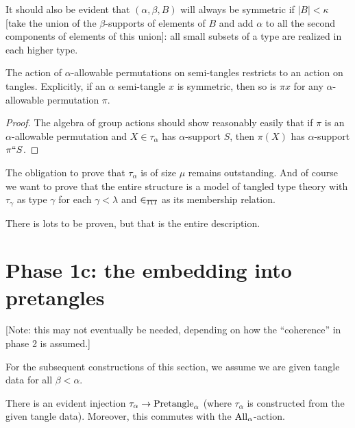 \begin{lemma}
\label {lem:small-subsets-closure}
\leanok
It should also be evident that $(\alpha,\beta,B)$ will always be symmetric if $|B|<\kappa$ [take the union of the $\beta$-supports of elements of $B$ and add $\alpha$ to all the second components of elements of this union]:  all small subsets of a type are realized in each higher type.
\end{lemma}

\begin{lemma}
  \label{lem:tangle-action}
  \leanok
  The action of $\alpha$-allowable permutations on semi-tangles restricts to an action on tangles.  Explicitly, if an $\alpha$ semi-tangle $x$ is symmetric, then so is $\pi x$ for any $\alpha$-allowable permutation $\pi$.
\end{lemma}
\begin{proof}
  The algebra of group actions should show reasonably easily that if $\pi$ is an $\alpha$-allowable permutation and $X \in \tau_\alpha$ has $\alpha$-support $S$, then $\pi(X)$ has $\alpha$-support $\pi``S$.
\end{proof}

The obligation to prove that $\tau_\alpha$ is of size $\mu$ remains outstanding.  And of course we want to prove that the entire structure is a model of tangled type theory with $\tau_\gamma$ as type $\gamma$ for each $\gamma<\lambda$ and $\in_{\tt TTT}$ as its membership relation.

There is lots to be proven, but that is the entire description.

\section{Phase 1c: the embedding into pretangles}

[Note: this may not eventually be needed, depending on how the “coherence” in phase 2 is assumed.]

For the subsequent constructions of this section, we assume we are given tangle data for all $\beta < \alpha$.

\begin{definition}
  \label{def:embedding-into-pretangles}
  There is an evident injection $\tau_\alpha \to \mathrm{Pretangle}_\alpha$ (where $\tau_\alpha$ is constructed from the given tangle data).  Moreover, this commutes with the $\mathrm{All}_\alpha$-action.
\end{definition}

